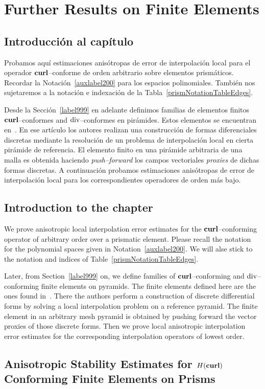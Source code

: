 \chapter{Further Results on Finite Elements}
\label{auxlabel202}
\section*{Introducci\'on al cap\'itulo}
Probamos aqu\'i estimaciones anis\'otropas de error de interpolaci\'on local
para el operador $\textbf{curl}$--conforme de orden arbitrario sobre elementos
prism\'aticos.
Recordar la Notaci\'on~\ref{auxlabel200} para los espacios polinomiales. 
Tambi\'en nos sujetaremos a la notaci\'on e indexaci\'on de la  
Tabla~\ref{prismNotationTableEdges}.

Desde la Secci\'on~\ref{label999} en adelante definimos
familias de elementos finitos 
$\textbf{curl}$--conformes and $\operatorname{\textrm{div}}$--conformes en pir\'amides. Estos elementos
se encuentran en~\cite{gh99}. En ese art\'iculo los autores
realizan una construcci\'on de formas diferenciales discretas
mediante la resoluci\'on de un problema de interpolaci\'on local
en cierta pir\'amide de referencia. El elemento finito en una
pir\'amide arbitraria de una malla es obtenida haciendo \emph{push--forward}
los campos vectoriales \emph{proxies} de dichas formas discretas.
A continuaci\'on probamos estimaciones anis\'otropas de error de interpolaci\'on
local para los correspondientes operadores de orden m\'as bajo.

\section*{Introduction to the chapter}
We prove anisotropic local interpolation error estimates for the
$\textbf{curl}$--conforming operator of arbitrary order over a prismatic element.
Please recall 
the notation for the polynomial spaces given in Notation~\ref{auxlabel200}. We 
will alse stick to the notation and indices of 
Table~\ref{prismNotationTableEdges}.

Later, from Section~\ref{label999} on, we define families of
$\textbf{curl}$--conforming and $\operatorname{\textrm{div}}$--conforming finite elements on pyramids.
The finite elements defined here 
are the ones found in~\cite{gh99}. There the authors
perform a
construction of discrete differential
forms by solving a local interpolation problem on a reference pyramid. The
finite element in an arbitrary mesh pyramid is obtained by pushing forward
the vector proxies of those discrete forms.
Then we prove local anisotropic interpolation error estimates for the
corresponding interpolation operators of lowest order.


\section{An\-iso\-tropic Stability Estimates for $H(\textbf{curl})$ Conforming Finite
Elements on Prisms}
\label{stab_edge_prism}




